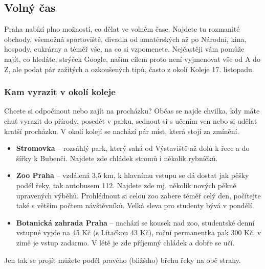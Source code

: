 \subsection{Volný čas}
Praha nabízí plno možností, co dělat ve volném čase. Najdete tu rozmanité
obchody, všemožná sportoviště, divadla od amatérských až po Národní, kina,
hospody, cukrárny a téměř vše, na co si vzpomenete. Nejčastěji vám pomůže najít,
co hledáte, strýček Google, naším cílem proto není vyjmenovat vše od A do Z, ale
podat pár zažitých a ozkoušených tipů, často z okolí Koleje 17. listopadu.


\subsubsection{Kam vyrazit v okolí koleje}
Chcete si odpočinout nebo zajít na procházku? Občas se najde chvilka, kdy máte
chuť vyrazit do přírody, posedět v parku, sednout si s učením ven nebo si udělat
kratší procházku. V okolí kolejí se nachází pár míst, která stojí za zmínění.
\begin{itemize}
\item \textbf{Stromovka} – rozsáhlý park, který sahá od Výstaviště až dolů k
řece a do šířky k Bubenči. Najdete zde chládek stromů i několik rybníčků.
\item \textbf{Zoo Praha} – vzdálená 3,5 km, k hlavnímu vstupu se dá dostat jak
pěšky podél řeky, tak autobusem 112. Najdete zde mj. několik nových pěkně
upravených výběhů. Prohlédnout si celou zoo zabere téměř celý den, počítejte
také s větším počtem návštěvníků. Velká sleva pro studenty bývá v pondělí.
\item \textbf{Botanická zahrada Praha} – nachází se kousek nad zoo, studentské
denní vstupné vyjde na 45 Kč (s Lítačkou 43 Kč), roční permanentka pak 300 Kč, v
zimě je vstup zadarmo. V létě je zde příjemný chládek a dobře se učí.
\end{itemize}
Jen tak se projít můžete podél pravého (bližšího) břehu řeky na obě strany.



